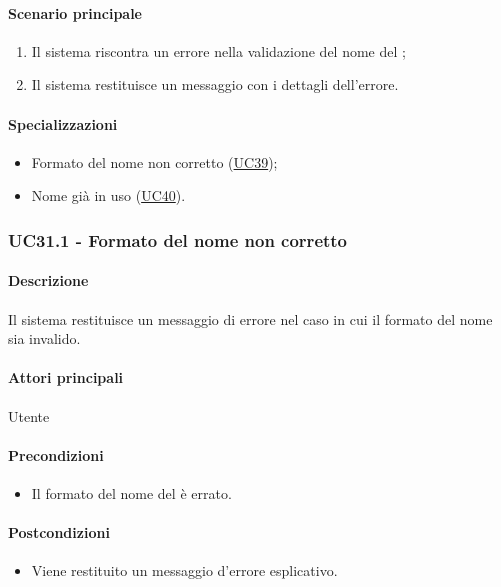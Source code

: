 \paragraph*{Scenario principale}
\begin{enumerate}
  \item Il sistema riscontra un errore nella validazione del nome del ;
  \item Il sistema restituisce un messaggio con i dettagli dell'errore.  
\end{enumerate}

\paragraph*{Specializzazioni}
\begin{itemize}
  \item Formato del nome non corretto (\hyperref[UC39]{UC39});
  \item Nome già in uso (\hyperref[UC40]{UC40}).
\end{itemize}


\subsubsection{UC31.1 - Formato del nome non corretto}\label{UC31point1}
\paragraph*{Descrizione}
Il sistema restituisce un messaggio di errore nel caso in cui il formato del nome sia invalido.

\paragraph*{Attori principali}
Utente

\paragraph*{Precondizioni}
\begin{itemize}
  \item Il formato del nome del  è errato.
\end{itemize}

\paragraph*{Postcondizioni}
\begin{itemize}
  \item Viene restituito un messaggio d'errore esplicativo.
\end{itemize}

